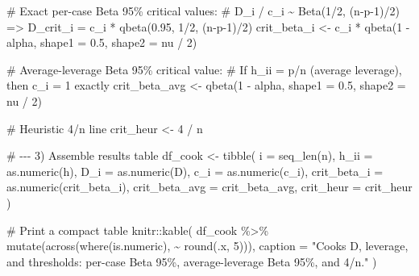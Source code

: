 \documentclass[
  letterpaper,
  DIV=11,
  numbers=noendperiod]{scrreprt}
\newenvironment{Shaded}{\begin{snugshade}}{\end{snugshade}}
\newcommand{\AttributeTok}[1]{\textcolor[rgb]{0.40,0.45,0.13}{#1}}
\newcommand{\CommentTok}[1]{\textcolor[rgb]{0.37,0.37,0.37}{#1}}
\newcommand{\DecValTok}[1]{\textcolor[rgb]{0.68,0.00,0.00}{#1}}
\newcommand{\FloatTok}[1]{\textcolor[rgb]{0.68,0.00,0.00}{#1}}
\newcommand{\FunctionTok}[1]{\textcolor[rgb]{0.28,0.35,0.67}{#1}}
\newcommand{\NormalTok}[1]{\textcolor[rgb]{0.00,0.23,0.31}{#1}}
\newcommand{\OtherTok}[1]{\textcolor[rgb]{0.00,0.23,0.31}{#1}}
\newcommand{\SpecialCharTok}[1]{\textcolor[rgb]{0.37,0.37,0.37}{#1}}
\newcommand{\StringTok}[1]{\textcolor[rgb]{0.13,0.47,0.30}{#1}}
\begin{document}
\begin{Shaded}
\begin{Highlighting}[]
\CommentTok{\# Exact per{-}case Beta 95\% critical values:}
\CommentTok{\# D\_i / c\_i \textasciitilde{} Beta(1/2, (n{-}p{-}1)/2)  =\textgreater{}  D\_crit\_i = c\_i * qbeta(0.95, 1/2, (n{-}p{-}1)/2)}
\NormalTok{crit\_beta\_i }\OtherTok{\textless{}{-}}\NormalTok{ c\_i }\SpecialCharTok{*} \FunctionTok{qbeta}\NormalTok{(}\DecValTok{1} \SpecialCharTok{{-}}\NormalTok{ alpha, }\AttributeTok{shape1 =} \FloatTok{0.5}\NormalTok{, }\AttributeTok{shape2 =}\NormalTok{ nu }\SpecialCharTok{/} \DecValTok{2}\NormalTok{)}

\CommentTok{\# Average{-}leverage Beta 95\% critical value:}
\CommentTok{\# If h\_ii = p/n (average leverage), then c\_i = 1 exactly}
\NormalTok{crit\_beta\_avg }\OtherTok{\textless{}{-}} \FunctionTok{qbeta}\NormalTok{(}\DecValTok{1} \SpecialCharTok{{-}}\NormalTok{ alpha, }\AttributeTok{shape1 =} \FloatTok{0.5}\NormalTok{, }\AttributeTok{shape2 =}\NormalTok{ nu }\SpecialCharTok{/} \DecValTok{2}\NormalTok{)}

\CommentTok{\# Heuristic 4/n line}
\NormalTok{crit\_heur }\OtherTok{\textless{}{-}} \DecValTok{4} \SpecialCharTok{/}\NormalTok{ n}

\CommentTok{\# {-}{-}{-} 3) Assemble results table}
\NormalTok{df\_cook }\OtherTok{\textless{}{-}} \FunctionTok{tibble}\NormalTok{(}
  \AttributeTok{i            =} \FunctionTok{seq\_len}\NormalTok{(n),}
  \AttributeTok{h\_ii         =} \FunctionTok{as.numeric}\NormalTok{(h),}
  \AttributeTok{D\_i          =} \FunctionTok{as.numeric}\NormalTok{(D),}
  \AttributeTok{c\_i          =} \FunctionTok{as.numeric}\NormalTok{(c\_i),}
  \AttributeTok{crit\_beta\_i  =} \FunctionTok{as.numeric}\NormalTok{(crit\_beta\_i),}
  \AttributeTok{crit\_beta\_avg =}\NormalTok{ crit\_beta\_avg,}
  \AttributeTok{crit\_heur    =}\NormalTok{ crit\_heur}
\NormalTok{)}

\CommentTok{\# Print a compact table}
\NormalTok{knitr}\SpecialCharTok{::}\FunctionTok{kable}\NormalTok{(}
\NormalTok{  df\_cook }\SpecialCharTok{\%\textgreater{}\%} \FunctionTok{mutate}\NormalTok{(}\FunctionTok{across}\NormalTok{(}\FunctionTok{where}\NormalTok{(is.numeric), }\SpecialCharTok{\textasciitilde{}} \FunctionTok{round}\NormalTok{(.x, }\DecValTok{5}\NormalTok{))),}
  \AttributeTok{caption =} \StringTok{"Cook\textquotesingle{}s D, leverage, and thresholds: per{-}case Beta 95\%, average{-}leverage Beta 95\%, and 4/n."}
\NormalTok{)}
\end{Highlighting}
\end{Shaded}
\end{document}
